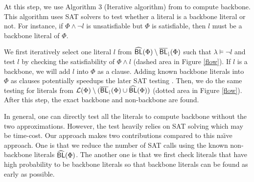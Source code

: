 \medskip
{}
At this step, we use Algorithm 3 (Iterative algorithm) from \cite{JLM15} to compute backbone.
This algorithm uses SAT solvers to test whether a literal is a backbone literal or not.
For instance, if $\Phi\wedge \neg l$ is unsatisfiable but $\Phi$ is satisfiable, then $l$ must be a backbone literal of $\Phi$.

We first iteratively select one literal $l$ from ${\sf \widehat{BL}}(\Phi)\setminus {\sf \overline{BL}_\downharpoonright}(\Phi)$ such that $\lambda \models \neg l$ and test $l$ by checking the satisfiability of $\Phi\wedge l$ (dashed area in Figure \ref{flow}).
If $l$ is a backbone, we will add $l$ into $\Phi$ as a clause. Adding known backbone literals into $\Phi$ as clauses potentially speedups the later SAT testing \cite{JLM15,MPA2015}.
Then, we do the same testing for literals from $\Lit(\Phi)\setminus (\NBLap(\Phi)\cup\BLap(\Phi))$ (dotted area in Figure \ref{flow}).
After this step, the exact backbone and non-backbone are found.


In general, one can directly test all the literals to compute backbone without the two approximations.
However, the test heavily relies on SAT solving which may be time-cost.
Our approach makes two contributions compared to this na\"{\i}ve approach.
One is that we reduce the number of SAT calls using the known non-backbone literals ${\sf \widehat{BL}}(\Phi)$.
The another one is that we first check literals that have high probability to be backbone literals so that backbone literals can be found as early as possible.

